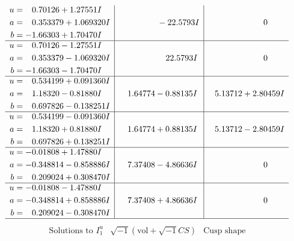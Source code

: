\documentclass[1p]{elsarticle_modified}
\theoremstyle{definition}
\newcommand{\I}{\sqrt{-1}}
\begin{document}
$$\begin{array}{c|c|c}
\begin{aligned}
u &= \phantom{-}0.70126 + 1.27551 I \\
a &= \phantom{-}0.353379 + 1.069320 I \\
b &= -1.66303 + 1.70470 I\end{aligned}
 & \phantom{-0.000000 } -22.5793 I & \phantom{-0.000000 } 0 \\ \hline\begin{aligned}
u &= \phantom{-}0.70126 - 1.27551 I \\
a &= \phantom{-}0.353379 - 1.069320 I \\
b &= -1.66303 - 1.70470 I\end{aligned}
 & \phantom{-0.000000 -}22.5793 I & \phantom{-0.000000 } 0 \\ \hline\begin{aligned}
u &= \phantom{-}0.534199 + 0.091360 I \\
a &= \phantom{-}1.18320 - 0.81880 I \\
b &= \phantom{-}0.697826 - 0.138251 I\end{aligned}
 & \phantom{-}1.64774 - 0.88135 I & \phantom{-}5.13712 + 2.80459 I \\ \hline\begin{aligned}
u &= \phantom{-}0.534199 - 0.091360 I \\
a &= \phantom{-}1.18320 + 0.81880 I \\
b &= \phantom{-}0.697826 + 0.138251 I\end{aligned}
 & \phantom{-}1.64774 + 0.88135 I & \phantom{-}5.13712 - 2.80459 I \\ \hline\begin{aligned}
u &= -0.01808 + 1.47880 I \\
a &= -0.348814 - 0.858886 I \\
b &= \phantom{-}0.209024 + 0.308470 I\end{aligned}
 & \phantom{-}7.37408 - 4.86636 I & \phantom{-0.000000 } 0 \\ \hline\begin{aligned}
u &= -0.01808 - 1.47880 I \\
a &= -0.348814 + 0.858886 I \\
b &= \phantom{-}0.209024 - 0.308470 I\end{aligned}
 & \phantom{-}7.37408 + 4.86636 I & \phantom{-0.000000 } 0\\
 \hline 
 \end{array}$$\newpage$$\begin{array}{c|c|c}  
\text{Solutions to }I^u_{1}& \I (\text{vol} + \sqrt{-1}CS) & \text{Cusp shape}\\

\end{array}$$
\end{document}
